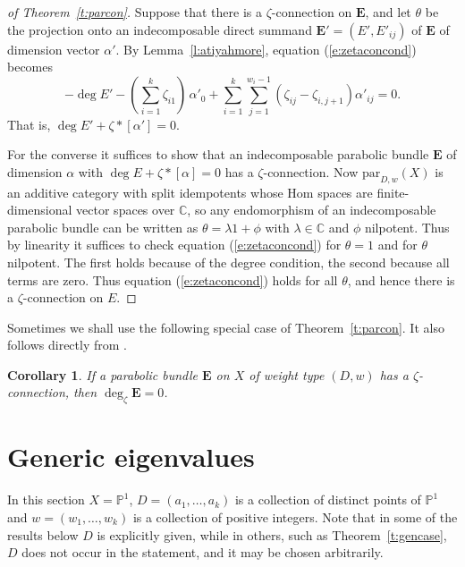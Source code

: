 \documentclass{amsart}
\theoremstyle{plain}
\newtheorem{cor}[thm]{Corollary}
\theoremstyle{definition}
\theoremstyle{remark}
\newcommand{\C}{\mathbb{C}}
\newcommand{\PP}{\mathbb{P}}
\newcommand{\E}{\mathbf{E}}
\begin{document}
\begin{proof}[of Theorem~\ref{t:parcon}]
Suppose that there is a $\zeta$-connection on $\E$,
and let $\theta$ be the projection onto an indecomposable direct
summand $\E' = (E',E'_{ij})$ of $\E$ of dimension vector $\alpha'$. By Lemma~\ref{l:atiyahmore},
equation (\ref{e:zetaconcond}) becomes
\[
-\deg E' - (\sum_{i=1}^k \zeta_{i1}) \, \alpha'_0 +
\sum_{i=1}^k
\sum_{j=1}^{w_i-1} (\zeta_{ij}-\zeta_{i,j+1}) \alpha'_{ij}
= 0.
\]
That is, $\deg E' + \zeta*[\alpha'] = 0$.

For the converse it suffices to show that an indecomposable
parabolic bundle $\E$ of dimension $\alpha$ with $\deg E + \zeta*[\alpha] = 0$
has a $\zeta$-connection. Now $\mathrm{par}_{D,w}(X)$
is an additive category with split idempotents whose Hom spaces are finite-dimensional
vector spaces over $\C$, so any
endomorphism of an indecomposable parabolic bundle can be written as $\theta = \lambda 1+\phi$
with $\lambda\in\C$ and $\phi$ nilpotent. Thus by linearity it suffices to check
equation (\ref{e:zetaconcond}) for $\theta = 1$ and for $\theta$ nilpotent.
The first holds because of the degree condition, the second because all terms are zero.
Thus equation (\ref{e:zetaconcond}) holds for all $\theta$, and hence there is
a $\zeta$-connection on $E$.
\end{proof}


Sometimes we shall use the following special case of Theorem~\ref{t:parcon}.
It also follows directly from \cite[Corollaire 3]{Mihai2}.


\begin{cor}\label{c:parconcor}
If a parabolic bundle $\E$ on $X$
of weight type $(D,w)$ has a $\zeta$-connection,
then $\deg_\zeta \E = 0$.
\end{cor}


















\section{Generic eigenvalues}\label{s:generic}
In this section $X=\PP^1$, $D=(a_1,\dots,a_k)$ is a collection
of distinct points of $\PP^1$ and $w=(w_1,\dots,w_k)$ is a collection of positive integers.
Note that in some of the results below $D$ is explicitly given, while in others, such
as Theorem~\ref{t:gencase}, $D$ does not occur in the statement, and it may be chosen
arbitrarily.
\end{document}
